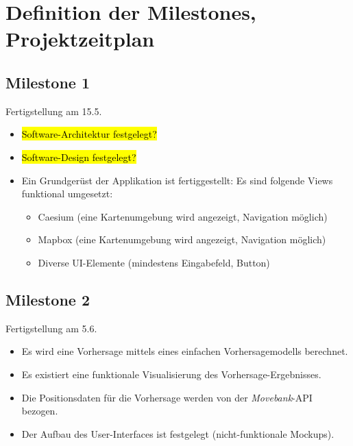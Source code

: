 \documentclass{article}
\begin{document}
	








	\section*{Definition der Milestones, Projektzeitplan}
	
	\subsection*{Milestone 1}
	Fertigstellung am 15.5.
	\begin{itemize} 
		\item \hl{Software-Architektur festgelegt?}
		\item \hl{Software-Design festgelegt?}	
	 	 \item Ein Grundgerüst der Applikation ist fertiggestellt: Es sind folgende Views funktional umgesetzt:
	 	 \begin{itemize} 
	 	  	 \item Caesium (eine Kartenumgebung wird angezeigt, Navigation möglich)
	 	  	 \item Mapbox (eine Kartenumgebung wird angezeigt, Navigation möglich)
	 	  	 \item Diverse UI-Elemente (mindestens Eingabefeld, Button)
	 	 \end{itemize} 
	\end{itemize} 

	\vspace{1em}

	\subsection*{Milestone 2}
	Fertigstellung am 5.6.
	\begin{itemize} 
	 	 \item Es wird eine Vorhersage mittels eines einfachen Vorhersagemodells berechnet.
	 	 \item Es existiert eine funktionale Visualisierung des Vorhersage-Ergebnisses.
	 	 \item Die Positionsdaten für die Vorhersage werden von der \textit{Movebank}-API bezogen.
	 	 \item Der Aufbau des User-Interfaces ist festgelegt (nicht-funktionale Mockups).
	\end{itemize}
\end{document}
